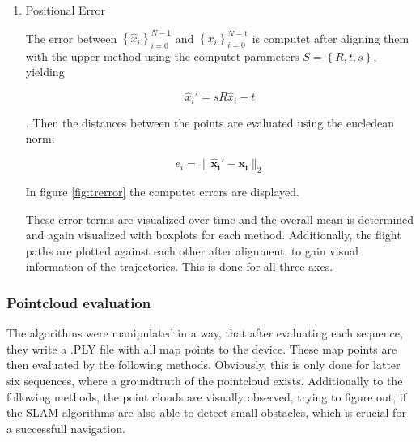 \begin{enumerate}
	\item{Positional Error}
	
	The error between $\left\{{\widehat{x}_i}\right\}_{i=0}^{N-1}$ and $\left\{{x_i}\right\}_{i=0}^{N-1}$ is computet after aligning them 
	with the upper method using the computet parameters $S = \left\{R,t,s\right\}$, yielding
	
	$$ \widehat{x}_i' = sR\widehat{x}_i - t $$
	
	. Then the distances between the points are evaluated using the eucledean norm: 
	
	$$ e_i = \lVert \mathbf{\widehat{x}_i' - x_i} \rVert_2$$
	
	
	In figure \ref{fig:trerror} the computet errors are displayed. 
	
	
	These error terms are visualized over time and the overall mean is determined and again visualized with boxplots for each method.
	Additionally, the flight paths are plotted against each other after alignment, to gain visual information of the trajectories. 
	This is done for all three axes. 
	
	\end{enumerate}
	
\subsubsection{Pointcloud evaluation}

The algorithms were manipulated in a way, that after evaluating each sequence, they write a .PLY file with all map points to 
the device. These map points are then evaluated by the following methods. Obviously, this is only done for  latter six sequences, 
where a groundtruth of the pointcloud exists. Additionally to the following methods, the point clouds are visually observed, 
trying to figure out, if the SLAM algorithms are also able to detect small obstacles, which is crucial for a successfull navigation. 
	
